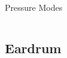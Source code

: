 \documentclass{beamer}
\newenvironment{variableblock}[3]{%
  \setbeamercolor{block body}{#2}
  \setbeamercolor{block title}{#3}
  \begin{block}{#1}}{\end{block}}
\begin{document}
\begin{frame}[t]
\begin{exampleblock}{Pressure Modes}
\begin{columns}
\end{columns}



 \end{exampleblock}
\end{frame}

\subsection{Eardrum}
\end{document}
